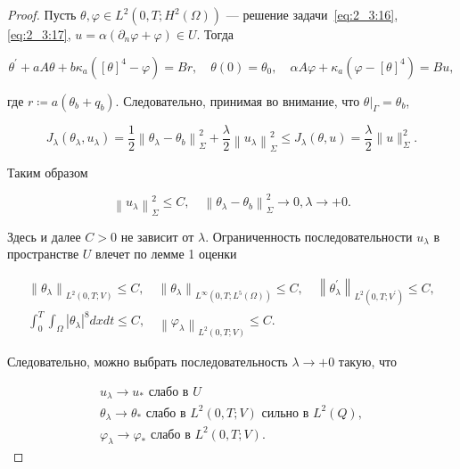 \begin{proof}
    Пусть $\theta, \varphi \in L^{2}\left(0, T ; H^{2}(\Omega)\right)$
    — решение задачи~\eqref{eq:2_3:16},\eqref{eq:2_3:17},
    $u=\alpha\left(\partial_{n} \varphi+\varphi\right) \in U$.
    Тогда

    \[
        \theta^{\prime}+a A \theta+b \kappa_{a}\left([\theta]^{4}-\varphi\right)=B r,
        \quad \theta(0)=\theta_{0}, \quad \alpha A \varphi
        + \kappa_{a}\left(\varphi-[\theta]^{4}\right)=B u,
    \]


    где $r\coloneqq a\left(\theta_{b}+q_{b}\right)$.
    Следовательно, принимая во внимание,
    что $\left.\theta\right|_{\Gamma}=\theta_{b}$,

    \[
        J_{\lambda}\left(\theta_{\lambda},
        u_{\lambda}\right)=\frac{1}{2}\left\|\theta_{\lambda}-\theta_{b}\right\|_{\Sigma}^{2}
        +\frac{\lambda}{2}\left\|u_{\lambda}\right\|_{\Sigma}^{2}
        \leq J_{\lambda}(\theta, u)=\frac{\lambda}{2}\|u\|_{\Sigma}^{2}.
    \]

    Таким образом

    \[
        \left\|u_{\lambda}\right\|_{\Sigma}^{2} \leq C, \quad\left\|\theta_{\lambda}
        -\theta_{b}\right\|_{\Sigma}^{2} \rightarrow 0, \lambda \rightarrow+0.
    \]


    Здесь и далее $C>0$ не зависит от $\lambda$.
    Ограниченность последовательности $u_{\lambda}$
    в пространстве $U$ влечет по лемме 1 оценки

    \[
        \begin{gathered}
            \left\|\theta_{\lambda}\right\|_{L^{2}(0, T ; V)} \leq C,
            \quad\left\|\theta_{\lambda}\right\|_{L^{\infty}
            \left(0, T ; L^{5}(\Omega)\right)} \leq C,
            \quad\left\|\theta_{\lambda}^{\prime}\right\|_{L^{2}
            \left(0, T ; V^{\prime}\right)} \leq C, \\
            \int_{0}^{T} \int_{\Omega}
            \left|\theta_{\lambda}\right|^{8} d x d t \leq C,
            \quad\left\|\varphi_{\lambda}\right\|_{L^{2}(0, T ; V)} \leq C.
        \end{gathered}
    \]


    Следовательно, можно выбрать последовательность $\lambda\rightarrow+0$ такую, что

    \[
        \begin{gathered}
            u_{\lambda} \rightarrow u_{*} \text { слабо в } U \\
            \theta_{\lambda} \rightarrow \theta_{*}
            \text { слабо в } L^{2}(0, T; V) \text { сильно в } L^{2}(Q), \\
            \varphi_{\lambda} \rightarrow \varphi_{*}
            \text { слабо в } L^{2}(0, T; V).
        \end{gathered}
    \]



\end{proof}
